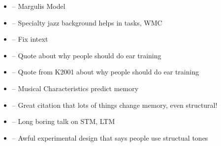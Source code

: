 \documentclass[]{book}
\providecommand{\tightlist}{%
  \setlength{\itemsep}{0pt}\setlength{\parskip}{0pt}}
\theoremstyle{definition}
\theoremstyle{definition}
\theoremstyle{definition}
\theoremstyle{remark}
\begin{document}
\begin{itemize}
\tightlist
\item
  \citep{margulisModelMelodicExpectation2005} -- Margulis Model
\item
  \citep{nicholsScoreOneJazz2018} -- Specialty jazz background helps in
  tasks, WMC
\item
  \citep{NASM201718HandbookPdf2018} -- Fix intext
\item
  \citep{schumann1860musikalische} -- Quote about why people should do
  ear training
\item
  \citep{smith1934solfege} -- Quote from K2001 about why people should
  do ear training
\item
  \citep{longRelationshipsPitchMemory1977} -- Musical Characteristics
  predict memory
\item
  \citep{taylorStrategiesMemoryShort1983} -- Great citation that lots of
  things change memory, even structural!
\item
  \citep{tallaricoStudyThreePhase} -- Long boring talk on STM, LTM
\item
  \citep{ouraConstructingRepresentationMelody1991a} -- Awful
  experimental design that says people use structual tones
\end{itemize}


\end{document}
